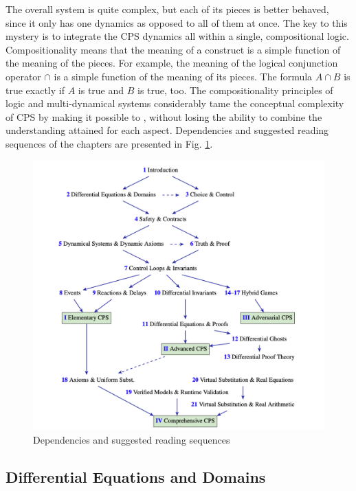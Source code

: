 The overall system is quite complex, but each of its pieces is better behaved, since it only has one dynamics as opposed to all of them at once.
The key to this mystery is to integrate the CPS dynamics all within a single, compositional logic.
Compositionality means that the meaning of a construct is a simple function of the meaning of the pieces.
For example, the meaning of the logical conjunction operator $\cap$ is a simple function of the meaning of its pieces.
The formula $A \cap B$ is true exactly if $A$ is true and $B$ is true, too.
The compositionality principles of logic and multi-dynamical systems considerably tame the conceptual complexity of CPS by making it possible to , without losing the ability to combine the understanding attained for each aspect.
Dependencies and suggested reading sequences of the chapters are presented in Fig. \ref{fig:socps}.

\begin{figure}
  \centering
  \includegraphics[width=.8\linewidth]{notes/hybridsystem/figures/structure-of-cps.png}
  \caption{Dependencies and suggested reading sequences}
  \label{fig:socps}
\end{figure}

\subsection{Differential Equations and Domains}

